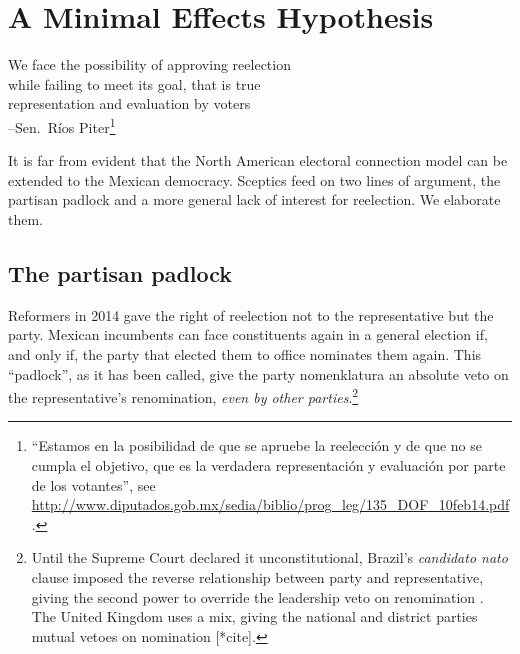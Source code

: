 \documentclass[letter,12pt]{article}
\begin{document}


\section{A Minimal Effects Hypothesis}

\begin{center}
\begin{singlespacing}
  We face the possibility of approving reelection \\
  while failing to meet its goal, that is true \\
  representation and evaluation by voters \\
  --Sen.\ Ríos Piter\footnote{``Estamos en la posibilidad de que se apruebe la reelección y de que no se cumpla el objetivo, que es la verdadera representación y evaluación por parte de los votantes'', see \url{http://www.diputados.gob.mx/sedia/biblio/prog_leg/135_DOF_10feb14.pdf}.}
\end{singlespacing}
\end{center}

\noindent It is far from evident that the North American electoral connection model can be extended to the Mexican democracy. Sceptics feed on two lines of argument, the partisan padlock and a more general lack of interest for reelection. We elaborate them. 

\subsection{The partisan padlock}

\noindent Reformers in 2014 gave the right of reelection not to the representative but the party. Mexican incumbents can face constituents again in a general election if, and only if, the party that elected them to office nominates them again. This ``padlock'', as it has been called, give the party nomenklatura an absolute veto on the representative's renomination, \emph{even by other parties}.\footnote{Until the Supreme Court declared it unconstitutional, Brazil's \emph{candidato nato} clause imposed the reverse relationship between party and representative, giving the second power to override the leadership veto on renomination \citep{mainwaring.1991}. The United Kingdom uses a mix, giving the national and district parties mutual vetoes on nomination [*cite].}
\end{document}
